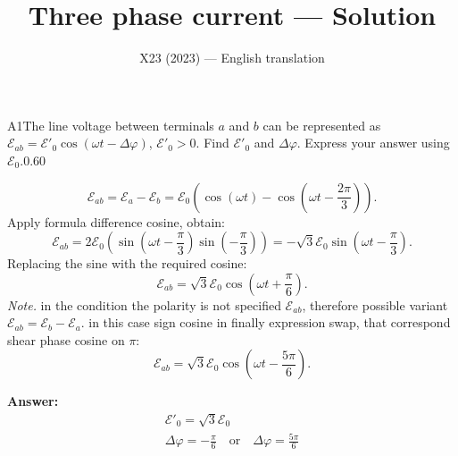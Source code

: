 \documentclass[11pt,a4paper]{article}
\title{\textbf{Three phase current --- Solution}}
\author{\normalsize X23 (2023) — English translation}
\date{}
\begin{document}
\maketitle\vspace{-0.5em}
\begin{solcard}{A1}{The line voltage between terminals $a$ and $b$ can be represented as $\mathcal{E}_{ab} = \mathcal{E'_0}  \cos \left(\omega t - \Delta \varphi \right)$, $\mathcal{E'_0} > 0$. Find $\mathcal{E'_0}$ and $ \Delta \varphi$. Express your answer using $\mathcal{E}_0$.}{0.60}

$$ \mathcal{E}_{ab} = \mathcal{E}_{a} -  \mathcal{E}_{b} =\mathcal{E}_{0} \left( \cos \left(\omega t\right) - \cos \left(\omega t - \frac{2\pi}{3}\right)\right). $$ Apply formula difference cosine, obtain: $$ \mathcal{E}_{ab} = 2 \mathcal{E}_{0}\left(\sin\left(\omega t - \frac{\pi}{3}\right) \sin\left(- \frac{\pi}{3}\right)\right) = -\sqrt{3} \mathcal{E}_{0} \sin\left(\omega t - \frac{\pi}{3}\right). $$ Replacing the sine with the required cosine: $$ \mathcal{E}_{ab} = \sqrt{3} \mathcal{E}_{0}\cos\left(\omega t + \frac{\pi}{6}\right).$$ \textit{Note.} in the condition the polarity is not specified $\mathcal{E}_{ab}$, therefore possible variant $\mathcal{E}_{ab} = \mathcal{E}_{b} - \mathcal{E}_{a}$. in this case sign cosine in finally expression swap, that correspond shear phase cosine on $\pi$: $$ \mathcal{E}_{ab} = \sqrt{3} \mathcal{E}_{0}\cos \left(\omega t - \frac{ 5\pi}{6}\right). $$

\par\smallskip\noindent\textbf{Answer:} $$\begin{aligned} \mathcal{E'_0} = \sqrt{3} \mathcal{E}_{0} \\
 \Delta \varphi = -\frac{ \pi}{6} \quad \text{or} \quad \Delta \varphi = \frac{ 5\pi}{6} \end{aligned}$$
\end{solcard}
\end{document}
